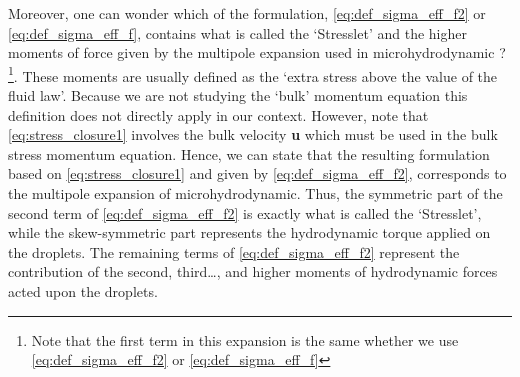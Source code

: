 Moreover, one can wonder which of the formulation, \ref{eq:def_sigma_eff_f2} or \ref{eq:def_sigma_eff_f}, contains what is called the `Stresslet' and the higher moments of force given by the multipole expansion used in microhydrodynamic ? \citep{pozrikidis1992boundary,kim2013microhydrodynamics}\footnote{Note that the first term in this expansion is the same whether we use \ref{eq:def_sigma_eff_f2} or \ref{eq:def_sigma_eff_f}}.   
These moments are usually defined as the `extra stress above the value of the fluid law'\citep{hinch1977averaged}.
Because we are not studying the `bulk' momentum equation this definition does not directly apply in our context. 
However, note that \ref{eq:stress_closure1} involves the bulk velocity \textbf{u} which must be used in the bulk stress momentum equation.
Hence, we can state that the resulting formulation based on \ref{eq:stress_closure1} and given by \ref{eq:def_sigma_eff_f2}, corresponds to the multipole expansion of microhydrodynamic. 
Thus, the symmetric part of the second term of \ref{eq:def_sigma_eff_f2} is exactly what is called the `Stresslet', while the skew-symmetric part represents the hydrodynamic torque applied on the droplets.
The remaining terms of \ref{eq:def_sigma_eff_f2} represent the contribution of the second, third\ldots, and higher moments of hydrodynamic forces acted upon the droplets.  




